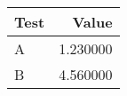 \begin{tabular}{lr}
\toprule
Test & Value \\
\midrule
A & 1.230000 \\
B & 4.560000 \\
\bottomrule
\end{tabular}
